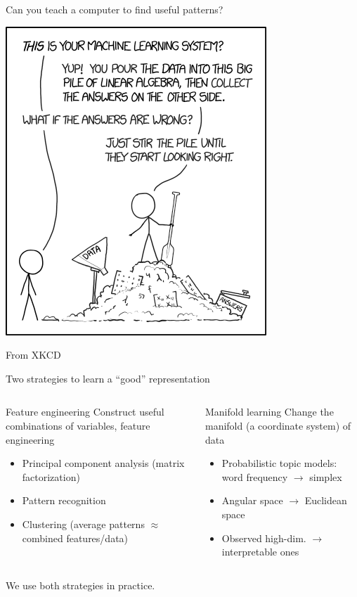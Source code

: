 \documentclass[
  ignorenonframetext,
  aspectratio=169]{beamer}
\begin{document}
\begin{frame}{Can you teach a computer to find useful patterns?}
\protect\hypertarget{can-you-teach-a-computer-to-find-useful-patterns}{}
\scriptsize

\begin{center}\includegraphics[width=.35\linewidth]{Vis/unsupervised/machine_learning} \end{center}

\normalsize

\tiny

From XKCD
\end{frame}

\begin{frame}{Two strategies to learn a ``good'' representation}
\protect\hypertarget{two-strategies-to-learn-a-good-representation}{}
\begin{columns}[T]
\begin{column}{.45\textwidth}
\begin{block}{Feature engineering}
\protect\hypertarget{feature-engineering}{}
Construct useful combinations of variables, feature engineering

\begin{itemize}
\item
  Principal component analysis (matrix factorization)
\item
  Pattern recognition
\item
  Clustering (average patterns \(\approx\) combined features/data)
\end{itemize}
\end{block}
\end{column}

\begin{column}{.45\textwidth}
\begin{block}{Manifold learning}
\protect\hypertarget{manifold-learning}{}
Change the manifold (a coordinate system) of data

\begin{itemize}
\item
  Probabilistic topic models: word frequency \(\to\) simplex
\item
  Angular space \(\to\) Euclidean space
\item
  Observed high-dim. \(\to\) interpretable ones
\end{itemize}
\end{block}
\end{column}
\end{columns}

We use both strategies in practice.
\end{frame}
\end{document}

